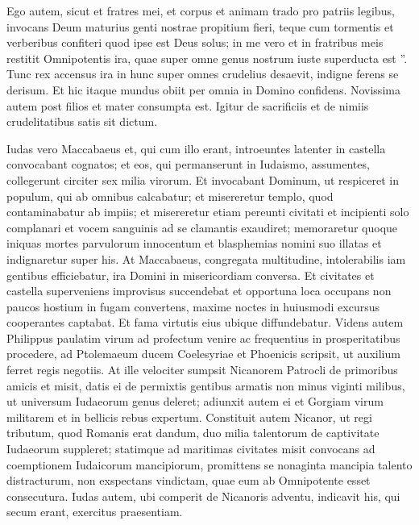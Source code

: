 \begin{biblechapter}
\begin{biblechapter}
\begin{biblechapter}
\begin{biblechapter}
\begin{biblechapter}
\begin{biblechapter}
\begin{biblechapter}
\verse Ego autem, sicut et fratres mei, et corpus et animam trado pro patriis legibus, invocans Deum maturius genti nostrae propitium fieri, teque cum tormentis et verberibus confiteri quod ipse est Deus solus; 
\verse in me vero et in fratribus meis restitit Omnipotentis ira, quae super omne genus nostrum iuste superducta est ”. 
\verse Tunc rex accensus ira in hunc super omnes crudelius desaevit, indigne ferens se derisum. 
\verse Et hic itaque mundus obiit per omnia in Domino confidens. 
\verse Novissima autem post filios et mater consumpta est.
 \verse Igitur de sacrificiis et de nimiis crudelitatibus satis sit dictum.
 
\begin{biblechapter}
\verse Iudas vero Maccabaeus et, qui cum illo erant, introeuntes latenter in castella convocabant cognatos; et eos, qui permanserunt in Iudaismo, assumentes, collegerunt circiter sex milia virorum. 
\verse Et invocabant Dominum, ut respiceret in populum, qui ab omnibus calcabatur; et misereretur templo, quod contaminabatur ab impiis; 
\verse et misereretur etiam pereunti civitati et incipienti solo complanari et vocem sanguinis ad se clamantis exaudiret; 
\verse memoraretur quoque iniquas mortes parvulorum innocentum et blasphemias nomini suo illatas et indignaretur super his. 
\verse At Maccabaeus, congregata multitudine, intolerabilis iam gentibus efficiebatur, ira Domini in misericordiam conversa. 
\verse Et civitates et castella superveniens improvisus succendebat et opportuna loca occupans non paucos hostium in fugam convertens, 
 \verse maxime noctes in huiusmodi excursus cooperantes captabat. Et fama virtutis eius ubique diffundebatur.
 \verse Videns autem Philippus paulatim virum ad profectum venire ac frequentius in prosperitatibus procedere, ad Ptolemaeum ducem Coelesyriae et Phoenicis scripsit, ut auxilium ferret regis negotiis. 
\verse At ille velociter sumpsit Nicanorem Patrocli de primoribus amicis et misit, datis ei de permixtis gentibus armatis non minus viginti milibus, ut universum Iudaeorum genus deleret; adiunxit autem ei et Gorgiam virum militarem et in bellicis rebus expertum. 
 \verse Constituit autem Nicanor, ut regi tributum, quod Romanis erat dandum, duo milia talentorum de captivitate Iudaeorum suppleret; 
\verse statimque ad maritimas civitates misit convocans ad coemptionem Iudaicorum mancipiorum, promittens se nonaginta mancipia talento distracturum, non exspectans vindictam, quae eum ab Omnipotente esset consecutura. 
\verse Iudas autem, ubi comperit de Nicanoris adventu, indicavit his, qui secum erant, exercitus praesentiam. 

\end{biblechapter}
\end{biblechapter}
\end{biblechapter}
\end{biblechapter}
\end{biblechapter}
\end{biblechapter}
\end{biblechapter}
\end{biblechapter}
